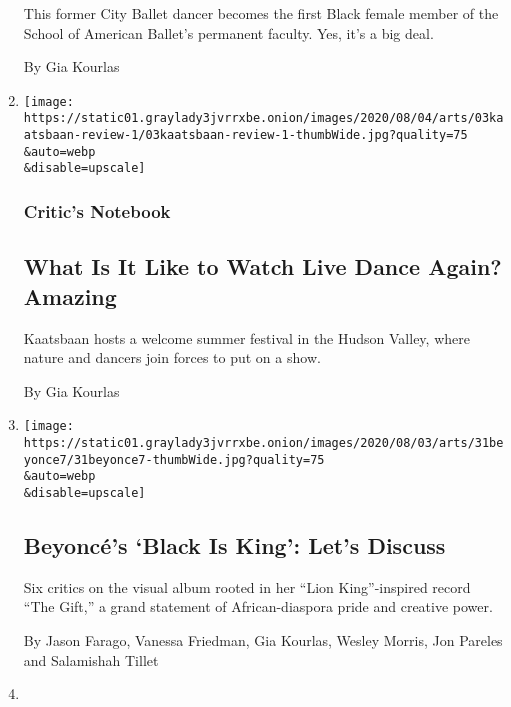 \begin{enumerate}
  This former City Ballet dancer becomes the first Black female member
  of the School of American Ballet's permanent faculty. Yes, it's a big
  deal.

  By Gia Kourlas
\item
  \href{/2020/08/03/arts/dance/kaatsbaan-dance.html}{}

  \texttt{[image: https://static01.graylady3jvrrxbe.onion/images/2020/08/04/arts/03kaatsbaan-review-1/03kaatsbaan-review-1-thumbWide.jpg?quality=75\\\&auto=webp\\\&disable=upscale]}

  \hypertarget{critics-notebook}{%
  \subsubsection{Critic's Notebook}\label{critics-notebook}}

  \hypertarget{what-is-it-like-to-watch-live-dance-again-amazing}{%
  \subsection{What Is It Like to Watch Live Dance Again?
  Amazing}\label{what-is-it-like-to-watch-live-dance-again-amazing}}

  Kaatsbaan hosts a welcome summer festival in the Hudson Valley, where
  nature and dancers join forces to put on a show.

  By Gia Kourlas
\item
  \href{/2020/07/31/arts/music/beyonce-black-is-king.html}{}

  \texttt{[image: https://static01.graylady3jvrrxbe.onion/images/2020/08/03/arts/31beyonce7/31beyonce7-thumbWide.jpg?quality=75\\\&auto=webp\\\&disable=upscale]}

  \hypertarget{beyoncuxe9s-black-is-king-lets-discuss}{%
  \subsection{Beyoncé's `Black Is King': Let's
  Discuss}\label{beyoncuxe9s-black-is-king-lets-discuss}}

  Six critics on the visual album rooted in her ``Lion King''-inspired
  record ``The Gift,'' a grand statement of African-diaspora pride and
  creative power.

  By Jason Farago, Vanessa Friedman, Gia Kourlas, Wesley Morris, Jon
  Pareles and Salamishah Tillet
\item
  \href{/2020/07/28/arts/dance/beach-sessions-rockaway-tiktok.html}{}


\end{enumerate}
